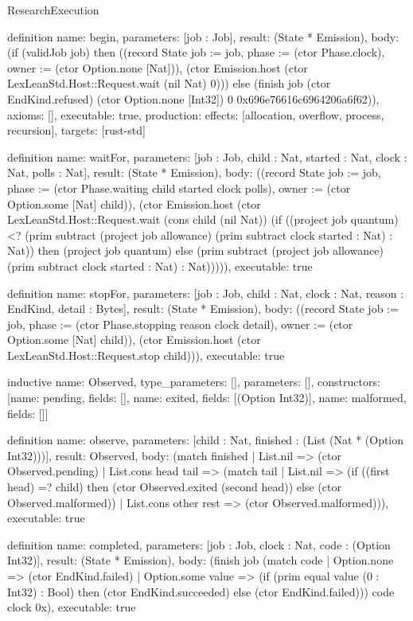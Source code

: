 \begin{lexlean}{ResearchExecution}
\begin{semanticmodule}
definition{
  name: begin,
  parameters: [job : Job],
  result: (State * Emission),
  body: (if (validJob job) then ((record State {job := job, phase := (ctor Phase.clock), owner := (ctor Option.none [Nat])}), (ctor Emission.host (ctor LexLeanStd.Host::Request.wait (nil Nat) 0))) else (finish job (ctor EndKind.refused) (ctor Option.none [Int32]) 0 0x696e76616c6964206a6f62)),
  axioms: [],
  executable: true,
  production: {effects: [allocation, overflow, process, recursion], targets: [rust-std]}
}

definition{
  name: waitFor,
  parameters: [job : Job, child : Nat, started : Nat, clock : Nat, polls : Nat],
  result: (State * Emission),
  body: ((record State {job := job, phase := (ctor Phase.waiting child started clock polls), owner := (ctor Option.some [Nat] child)}), (ctor Emission.host (ctor LexLeanStd.Host::Request.wait (cons child (nil Nat)) (if ((project job quantum) <? (prim subtract (project job allowance) (prim subtract clock started : Nat) : Nat)) then (project job quantum) else (prim subtract (project job allowance) (prim subtract clock started : Nat) : Nat))))),
  executable: true
}

definition{
  name: stopFor,
  parameters: [job : Job, child : Nat, clock : Nat, reason : EndKind, detail : Bytes],
  result: (State * Emission),
  body: ((record State {job := job, phase := (ctor Phase.stopping reason clock detail), owner := (ctor Option.some [Nat] child)}), (ctor Emission.host (ctor LexLeanStd.Host::Request.stop child))),
  executable: true
}

inductive{
  name: Observed,
  type_parameters: [],
  parameters: [],
  constructors: [{name: pending, fields: []}, {name: exited, fields: [(Option Int32)]}, {name: malformed, fields: []}]
}

definition{
  name: observe,
  parameters: [child : Nat, finished : (List (Nat * (Option Int32)))],
  result: Observed,
  body: (match finished
    | List.nil => (ctor Observed.pending)
    | List.cons head tail => (match tail
      | List.nil => (if ((first head) =? child) then (ctor Observed.exited (second head)) else (ctor Observed.malformed))
      | List.cons other rest => (ctor Observed.malformed))),
  executable: true
}

definition{
  name: completed,
  parameters: [job : Job, clock : Nat, code : (Option Int32)],
  result: (State * Emission),
  body: (finish job (match code | Option.none => (ctor EndKind.failed) | Option.some value => (if (prim equal value (0 : Int32) : Bool) then (ctor EndKind.succeeded) else (ctor EndKind.failed))) code clock 0x),
  executable: true
}


\end{semanticmodule}
\end{lexlean}
